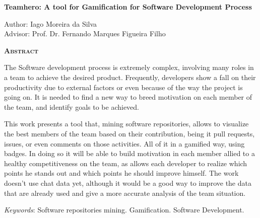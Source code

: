 \begin{center}
	{\Large{\textbf{Teamhero: A tool for Gamification for Software Development Process}}}
\end{center}

\vspace{1cm}

\begin{flushright}
	Author: Iago Moreira da Silva\\
	Advisor: Prof. Dr. Fernando Marques Figueira Filho
\end{flushright}

\vspace{1cm}

\begin{center}
	\Large{\textsc{\textbf{Abstract}}}
\end{center}

\noindent The Software development process is extremely complex, involving many roles in a team to achieve the desired product. Frequently, developers show a fall on their productivity due to external factors or even because of the way the project is going on. It is needed to find a new way to breed motivation on each member of the team, and identify goals to be achieved.

\noindent
This work presents a tool that, mining software repositories, allows to visualize the best members of the team based on their contribution, being it pull requests, issues, or even comments on those activities. All of it in a gamified way, using badges. In doing so it will be able to build motivation in each member allied to a healthy competitiveness on the team, as allows each developer to realize which points he stands out and which points he should improve himself. The work doesn't use chat data yet, although it would be a good way to improve the data that are already used and give a more accurate analysis of the team situation.

\noindent\textit{Keywords}: Software repositories mining. Gamification. Software Development.
